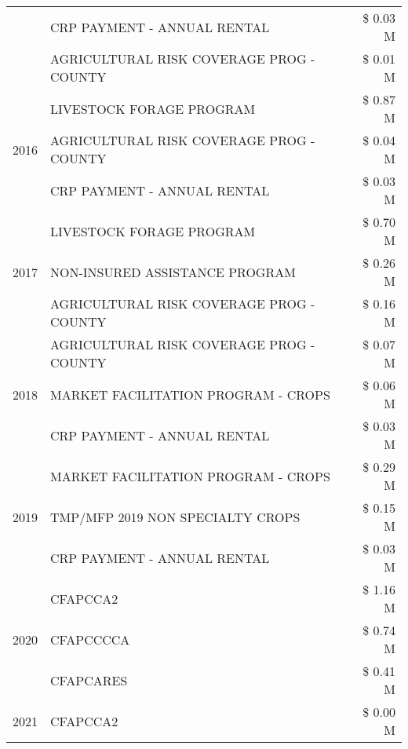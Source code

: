 \begin{tabular}{llr}
 & CRP PAYMENT - ANNUAL RENTAL & \$ 0.03 M \\
 & AGRICULTURAL RISK COVERAGE PROG - COUNTY & \$ 0.01 M \\
\cline{1-3}
\multirow[t]{3}{*}{2016} & LIVESTOCK FORAGE PROGRAM                      & \$ 0.87 M \\
 & AGRICULTURAL RISK COVERAGE PROG - COUNTY      & \$ 0.04 M \\
 & CRP PAYMENT - ANNUAL RENTAL                   & \$ 0.03 M \\
\cline{1-3}
\multirow[t]{3}{*}{2017} & LIVESTOCK FORAGE PROGRAM & \$ 0.70 M \\
 & NON-INSURED ASSISTANCE PROGRAM & \$ 0.26 M \\
 & AGRICULTURAL RISK COVERAGE PROG - COUNTY & \$ 0.16 M \\
\cline{1-3}
\multirow[t]{3}{*}{2018} & AGRICULTURAL RISK COVERAGE PROG - COUNTY & \$ 0.07 M \\
 & MARKET FACILITATION PROGRAM - CROPS & \$ 0.06 M \\
 & CRP PAYMENT - ANNUAL RENTAL & \$ 0.03 M \\
\cline{1-3}
\multirow[t]{3}{*}{2019} & MARKET FACILITATION PROGRAM - CROPS & \$ 0.29 M \\
 & TMP/MFP 2019 NON SPECIALTY CROPS & \$ 0.15 M \\
 & CRP PAYMENT - ANNUAL RENTAL & \$ 0.03 M \\
\cline{1-3}
\multirow[t]{3}{*}{2020} & CFAPCCA2 & \$ 1.16 M \\
 & CFAPCCCCA & \$ 0.74 M \\
 & CFAPCARES & \$ 0.41 M \\
\cline{1-3}
2021 & CFAPCCA2 & \$ 0.00 M \\
\cline{1-3}
\bottomrule
\end{tabular}
